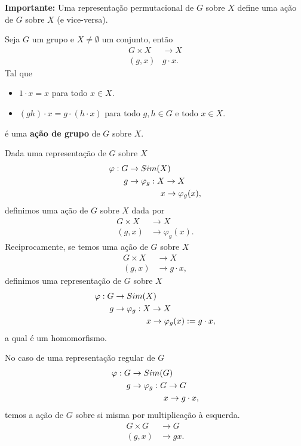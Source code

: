 \textbf{Importante:} Uma representação permutacional de $G$ sobre $X$ define uma ação de $G$ sobre $X$ (e vice-versa).
\begin{definition}
  Seja $G$ um grupo e $X\neq \emptyset$ um conjunto, então
  \begin{align*}
    G\times X&\to X\\
    (g,x)&g\cdot x.
  \end{align*}
  Tal que
  \begin{itemize}
    \item $1\cdot x=x$ para todo $x\in X$.
    \item $(gh)\cdot x=g\cdot(h\cdot x)$ para todo $g,h\in G$ e todo $x\in X$. 
  \end{itemize}
  é uma \textbf{ação de grupo} de $G$ sobre $X$. 
\end{definition}
\begin{note}
  Dada uma representação de $G$ sobre $X$
  \begin{align*}
    \varphi: G&\to Sim(X)\\
    g&\to \varphi_g:X\to X\\
    \phantom{g}&\phantom{\to \varphi_g:}\hspace{0.34cm}x\to \varphi_g(x),    
  \end{align*}
  definimos uma ação de $G$ sobre $X$ dada por
  \begin{align*}
    G\times X&\to X\\
    (g,x)&\to\varphi_{g}(x).
  \end{align*}
  Reciprocamente, se temos uma ação de $G$  sobre $X$
  \begin{align*}
    G\times X&\to X\\
    (g,x)&\to g\cdot x,
  \end{align*}
  definimos uma representação de $G$ sobre $X$
  \begin{align*}
    \varphi: G&\to Sim(X)\\
    g&\to \varphi_g:X\to X\\
    \phantom{g}&\phantom{\to \varphi_g:}\hspace{0.34cm}x\to \varphi_g(x):=g\cdot x, 
  \end{align*}
  a qual é um homomorfismo.
\end{note}
\begin{example}
  No caso de uma representação regular de $G$
  \begin{align*}
    \varphi: G&\to Sim(G)\\
    g&\to \varphi_g:G\to G\\
    \phantom{g}&\phantom{\to \varphi_g:}\hspace{0.34cm}x\to g\cdot x,    
  \end{align*}
  temos a ação de $G$ sobre si misma por multiplicação à esquerda.
  \begin{align*}
    G\times G&\to G\\
    (g,x)&\to gx.
  \end{align*}
\end{example}
